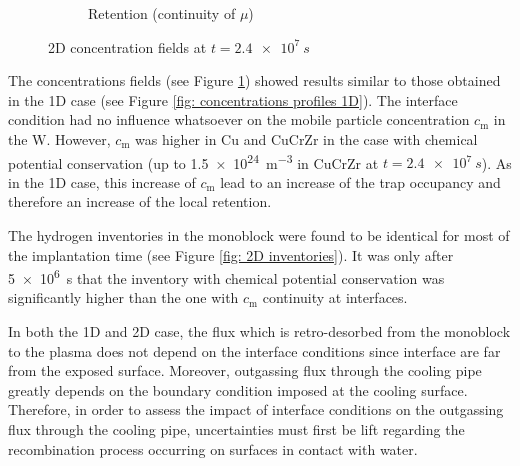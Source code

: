 \begin{figure}
\begin{subfigure}{0.5\linewidth}
        \caption{Retention (continuity of $\mu$)}
    \end{subfigure}
    \caption{2D concentration fields at $t=\SI{2.4e7}{s}$}
    \label{fig: concentrations fields 2d}
\end{figure}

The concentrations fields (see Figure \ref{fig: concentrations fields 2d}) showed results similar to those obtained in the 1D case (see Figure \ref{fig: concentrations profiles 1D}).
The interface condition had no influence whatsoever on the mobile particle concentration $c_\mathrm{m}$ in the W.
However, $c_\mathrm{m}$ was higher in Cu and CuCrZr in the case with chemical potential conservation (up to \SI{1.5e24}{m^{-3}} in CuCrZr at $t=\SI{2.4e7}{s}$).
As in the 1D case, this increase of $c_\mathrm{m}$ lead to an increase of the trap occupancy and therefore an increase of the local retention.

The hydrogen inventories in the monoblock were found to be identical for most of the implantation time (see Figure \ref{fig: 2D inventories}).
It was only after \SI{5e6}{s} that the inventory with chemical potential conservation was significantly higher than the one with $c_\mathrm{m}$ continuity at interfaces.

In both the 1D and 2D case, the flux which is retro-desorbed from the monoblock to the plasma does not depend on the interface conditions since interface are far from the exposed surface.
Moreover, outgassing flux through the cooling pipe greatly depends on the boundary condition imposed at the cooling surface.
Therefore, in order to assess the impact of interface conditions on the outgassing flux through the cooling pipe, uncertainties must first be lift regarding the recombination process occurring on surfaces in contact with water.

